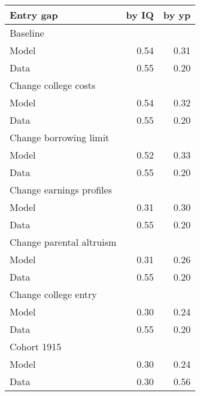 \begin{tabular}{lrr}
\hline
Entry gap & by IQ  & by yp  \\ 
\hline
Baseline &   &   \\ 
Model & 0.54  & 0.31  \\ 
Data & 0.55  & 0.20  \\ 
Change college costs &   &   \\ 
Model & 0.54  & 0.32  \\ 
Data & 0.55  & 0.20  \\ 
Change borrowing limit &   &   \\ 
Model & 0.52  & 0.33  \\ 
Data & 0.55  & 0.20  \\ 
Change earnings profiles &   &   \\ 
Model & 0.31  & 0.30  \\ 
Data & 0.55  & 0.20  \\ 
Change parental altruism &   &   \\ 
Model & 0.31  & 0.26  \\ 
Data & 0.55  & 0.20  \\ 
Change college entry &   &   \\ 
Model & 0.30  & 0.24  \\ 
Data & 0.55  & 0.20  \\ 
Cohort 1915 &   &   \\ 
Model & 0.30  & 0.24  \\ 
Data & 0.30  & 0.56  \\ 
\hline
\end{tabular}%
